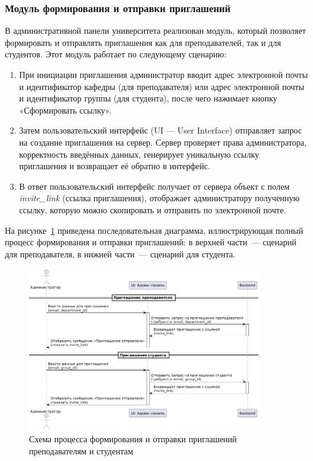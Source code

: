 \subsubsection{Модуль формирования и отправки приглашений}
В административной панели университета реализован модуль, который позволяет формировать и отправлять приглашения как для преподавателей, так и для студентов. Этот модуль работает по следующему сценарию:

\begin{enumerate}
    \item При инициации приглашения администратор вводит адрес электронной почты и идентификатор кафедры (для преподавателя) или адрес электронной почты и идентификатор группы (для студента), после чего нажимает кнопку «Сформировать ссылку».

    \item Затем пользовательский интерфейс (UI — User Interface) отправляет запрос на создание приглашения на сервер. Сервер проверяет права администратора, корректность введённых данных, генерирует уникальную ссылку приглашения и возвращает её обратно в интерфейс.

    \item В ответ пользовательский интерфейс получает от сервера объект с полем \textit{invite\_link} (ссылка приглашения), отображает администратору полученную ссылку, которую можно скопировать и отправить по электронной почте.
\end{enumerate}

На рисунке~\ref{fig:admin-invite} приведена последовательная диаграмма, иллюстрирующая полный процесс формирования и отправки приглашений: в верхней части~--- сценарий для преподавателя, в нижней части~--- сценарий для студента.

\begin{figure}[h]
    \centering
    \includegraphics[width=0.9\textwidth]{static/diagrams/Admin.png}
    \caption{Схема процесса формирования и отправки приглашений преподавателям и студентам}
    \label{fig:admin-invite}
\end{figure}

